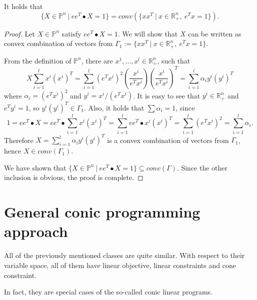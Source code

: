 \documentclass[12pt]{book}
\theoremstyle{definition}
\begin{document}
\lema \label{convHullReprLema} It holds that $$\{X\in \mathbb{P}^n\ \vert \ ee^T\bullet X = 1\} = conv\left( \{ xx^T \ \vert \ x\in\mathbb{R}^n_+, \ e^T x = 1 \}\right). $$ \rm
\begin{proof}
Let $X\in\mathbb{P}^n$ satisfy $ee^T\bullet X = 1$. We will show that $X$ can be written as convex combination of vectors from $\Gamma_1:= \{ xx^T \ \vert \ x\in\mathbb{R}^n_+, \ e^T x = 1 \}.$ 

From the definition of $\mathbb{P}^n$, there are $x^1,\dots ,x^l\in \mathbb{R}^n_+$, such that  
\begin{equation*}
 X  \sum_{i=1}^l x^i(x^i)^T = \sum_{i=1}^l  (e^Tx^i)^2 \left(\frac{x^i}{e^Tx^i}\right)\left(\frac{x^i}{e^Tx^i}\right)^T =  \sum_{i=1}^l  \alpha_i y^i(y^i)^T
\end{equation*}
where $\alpha_i = (e^Tx^i)^2$ and $y^i =  x^i/(e^Tx^i)$. It is easy to see that $y^i\in \mathbb{R}^n_+$ and $e^Ty^i = 1$, so $y^i(y^i)^T\in \Gamma_1$.  
Also, it holds that $\sum \alpha_i = 1$, since 
\begin{equation*}
1 = ee^T\bullet X = ee^T\bullet \sum_{i=1}^l x^i(x^i)^T = \sum_{i=1}^lee^T\bullet x^i(x^i)^T = \sum_{i=1}^l (e^Tx^i)^2 = \sum_{i=1}^l \alpha_i.
\end{equation*}
Therefore $X = \sum_{i=1}^l  \alpha_i y^i(y^i)^T$ is a convex combination of vectors from $\Gamma_1$, hence $X\in conv(\Gamma_1)$.

We have shown that $\{X\in \mathbb{P}^n\ \vert \ ee^T\bullet X = 1\} \subseteq conv(\Gamma)$. Since the other inclusion is obvious, the proof is complete.

\end{proof}




\section{General conic programming approach}

All of the previously mentioned classes are quite similar. 
With respect to their variable space, all of them have linear objective, linear constraints and cone constraint.

In fact, they are special cases of the so-called conic linear programs.
\end{document}
